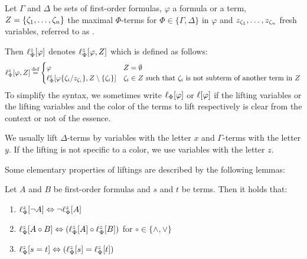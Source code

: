 \begin{defi}[Lifting]
	Let $\Gamma$ and $\Delta$ be sets of first-order formulas, 
	$\varphi$ a formula or a term, $Z=\{\colterm{1}, \dotsc, \colterm{n}\}$ the maximal $\Phi$-terms for $\Phi \in \{\Gamma, \Delta\}$ in $\varphi$ and $z_{\colterm{1}}, \ldots, z_{\colterm{n}}$ fresh variables, referred to as .

	Then $\lft{\Phi}{z}{\varphi}$ denotes %
	$\lft{\Phi}{z}{\varphi, Z}$ which is defined as follows:
\[\lft{\Phi}{z}{\varphi, Z} \defeq \begin{cases} \varphi & Z = \emptyset \\ \lft{\Phi}{z}{\varphi\abstractionOp{\colterm{i}/z_{\colterm{i}}}, Z\setminus\{\colterm{i}\}} & \text{$\colterm{i} \in Z$ such that $\colterm{i}$ is not subterm of another term in $Z$} \end{cases}\]
	To simplify the syntax, we sometimes write $\lifphinovar{\varphi}$ or $\lifboth{\varphi}$ if the lifting variables or the lifting variables and the color of the terms to lift respectively is clear from the context or not of the essence.
\end{defi}

We usually lift $\Delta$-terms by variables with the letter $x$ and $\Gamma$-terms with the letter $y$. If the lifting is not specific to a color, we use variables with the letter $z$.


Some elementary properties of liftings are described by the following lemmas:

 
\begin{lemma}
  \label{lemma:lift_commute}
  Let $A$ and $B$ be first-order formulas and $s$ and $t$ be terms. Then it holds that:
  \begin{enumerate}
    \item $\lift{\Phi}{\lnot A}{z} \spas\semiff{} \lnot \lift{\Phi}{A}{z}$
    \item $\lift{\Phi}{A \circ B}{z} \spas\semiff{} ( \lift{\Phi}{A}{z} \circ \lift{\Phi}{B}{z} )$ for  $\circ \in \{\land, \lor\}$
		\item $\lift{\Phi}{s = t}{z} \spas\semiff{} ( \lift{\Phi}{s}{z} = \lift{\Phi}{t}{z} )$
	\end{enumerate}
\end{lemma}

